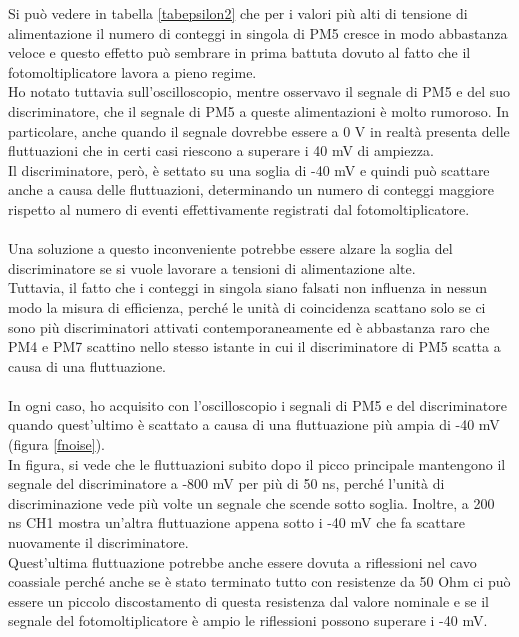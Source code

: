 \documentclass{article}
\begin{document}
Si può vedere in tabella \ref{tabepsilon2} che per i valori più alti di tensione di alimentazione il numero di conteggi in singola di PM5 cresce in modo abbastanza veloce e questo effetto può sembrare in prima battuta dovuto al fatto che il fotomoltiplicatore lavora a pieno regime. 
\\
Ho notato tuttavia sull'oscilloscopio, mentre osservavo il segnale di PM5 e del suo discriminatore, che il segnale di PM5 a queste alimentazioni è molto rumoroso. 
In particolare, anche quando il segnale dovrebbe essere a 0 V in realtà presenta delle fluttuazioni che in certi casi riescono a superare i 40 mV di ampiezza. \\
Il discriminatore, però, è settato su una soglia di -40 mV e quindi può scattare anche a causa delle fluttuazioni, determinando un numero di conteggi maggiore rispetto al numero di eventi effettivamente registrati dal fotomoltiplicatore. 
\\
\\
Una soluzione a questo inconveniente potrebbe essere alzare la soglia del discriminatore se si vuole lavorare a tensioni di alimentazione alte.\\
Tuttavia, il fatto che i conteggi in singola siano falsati non influenza in nessun modo la misura di efficienza, perché le unità di coincidenza scattano solo se ci sono più discriminatori attivati contemporaneamente ed è abbastanza raro che PM4 e PM7 scattino nello stesso istante in cui il discriminatore di PM5 scatta a causa di una fluttuazione. 
\\
\\
In ogni caso, ho acquisito con l'oscilloscopio i segnali di PM5 e del discriminatore quando quest'ultimo è scattato a causa di una fluttuazione più ampia di -40 mV (figura \ref{fnoise}). \\
In figura, si vede che le fluttuazioni subito dopo il picco principale mantengono il segnale del discriminatore a -800 mV per più di 50 ns, perché l'unità di discriminazione vede più volte un segnale che scende sotto soglia. Inoltre, a 200 ns CH1 mostra un'altra fluttuazione appena sotto i -40 mV che fa scattare nuovamente il discriminatore. \\
Quest'ultima fluttuazione potrebbe anche essere dovuta a riflessioni nel cavo coassiale perché anche se è stato terminato tutto con resistenze da 50 Ohm ci può essere un piccolo discostamento di questa resistenza dal valore nominale e se il segnale del fotomoltiplicatore è ampio le riflessioni possono superare i -40 mV.
\end{document}
